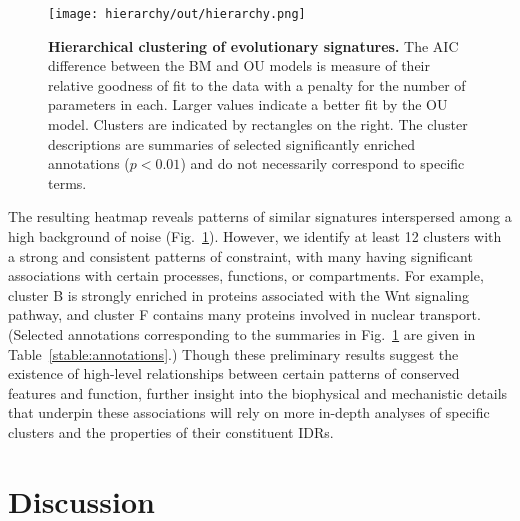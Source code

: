 \begin{figure}[h!]
\texttt{[image: hierarchy/out/hierarchy.png]}
\centering
\caption{\textbf{Hierarchical clustering of evolutionary signatures.}
The AIC difference between the BM and OU models is measure of their relative goodness of fit to the data with a penalty for the number of parameters in each. Larger values indicate a better fit by the OU model. Clusters are indicated by rectangles on the right. The cluster descriptions are summaries of selected significantly enriched annotations ($p < 0.01$) and do not necessarily correspond to specific terms.}
\label{fig:hierarchy}
\end{figure}

The resulting heatmap reveals patterns of similar signatures interspersed among a high background of noise (Fig.~\ref{fig:hierarchy}). However, we identify at least 12 clusters with a strong and consistent patterns of constraint, with many having significant associations with certain processes, functions, or compartments. For example, cluster B is strongly enriched in proteins associated with the Wnt signaling pathway, and cluster F contains many proteins involved in nuclear transport. (Selected annotations corresponding to the summaries in Fig.~\ref{fig:hierarchy} are given in Table~\ref{stable:annotations}.)  Though these preliminary results suggest the existence of high-level relationships between certain patterns of conserved features and function, further insight into the biophysical and mechanistic details that underpin these associations will rely on more in-depth analyses of specific clusters and the properties of their constituent IDRs.

\section{Discussion}

